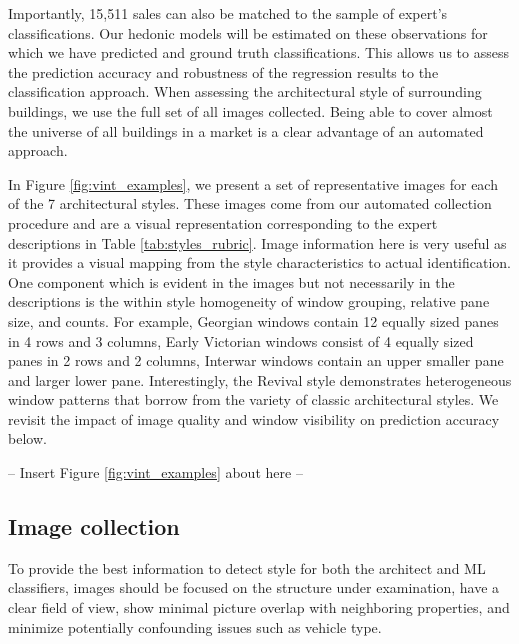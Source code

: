 \documentclass[]{article}
\begin{document}
 Importantly, 15,511 sales can also be matched to the sample of expert's classifications. Our hedonic models will be estimated on these observations for which we have predicted and ground truth classifications. This allows us to assess the prediction accuracy and robustness of the regression results to the classification approach. When assessing the architectural style of surrounding buildings, we use the full set of all images collected. Being able to cover almost the universe of all buildings in a market is a clear advantage of an automated approach.

In Figure \ref{fig:vint_examples}, we present a set of representative images for each of the 7 architectural styles. These images come from our automated collection procedure and are a visual representation corresponding to the expert descriptions in Table \ref{tab:styles_rubric}. Image information here is very useful as it provides a visual mapping from the style characteristics to actual identification. One component which is evident in the images but not necessarily in the descriptions is the within style homogeneity of window grouping, relative pane size, and counts. For example, Georgian windows contain 12 equally sized panes in 4 rows and 3 columns, Early Victorian windows consist of 4 equally sized panes in 2 rows and 2 columns, Interwar windows contain an upper smaller pane and larger lower pane. Interestingly, the Revival style demonstrates heterogeneous window patterns that borrow from the variety of classic architectural styles. We revisit the impact of image quality and window visibility on prediction accuracy below.


\begin{center}
  -- Insert Figure \ref{fig:vint_examples} about here --
\end{center}

\hypertarget{image-collection}{%
\subsection{Image collection}\label{image-collection}}

To provide the best information to detect style for both the architect and ML classifiers, images should be focused on the structure under examination, have a clear field of view, show minimal picture overlap with neighboring properties, and minimize potentially confounding issues such as  vehicle type.
\end{document}
